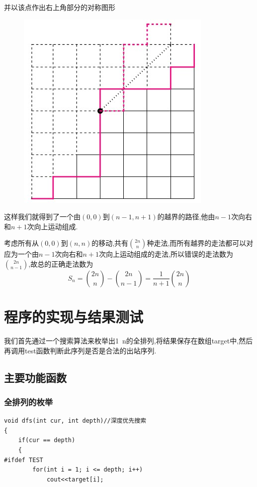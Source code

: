 \documentclass[a4paper,cs4size,oneside,fancyhdr]{ctexrep}
\theoremstyle{nonumberplain}%
\theoremstyle{nonumberplain}%
\begin{document}
{{\flushleft
并以该点作出右上角部分的对称图形

\begin{figure}[htbp]%
\centering
\includegraphics[scale=1]{3.jpg}
\end{figure}

这样我们就得到了一个由$(0,0)$到$(n-1,n+1)$的越界的路径,他由$n-1$次向右和$n+1$次向上运动组成.

考虑所有从$(0,0)$到$(n,n)$的移动,共有$\displaystyle\binom{2n}{n}$种走法,而所有越界的走法都可以对应为一个由$n-1$次向右和$n+1$次向上运动组成的走法,所以错误的走法数为$\displaystyle\binom{2n}{n-1}$,故总的正确走法数为
\[S_n=\binom{2n}{n}-\binom{2n}{n-1}=\frac{1}{n+1}\binom{2n}{n}\]



\chapter{程序的实现与结果测试}
我们首先通过一个搜索算法来枚举出1~n的全排列,将结果保存在数组target中,然后再调用test函数判断此序列是否是合法的出站序列.

\section{主要功能函数}
\subsection{全排列的枚举}
\begin{verbatim}
void dfs(int cur, int depth)//深度优先搜索
{
    if(cur == depth)
    {
#ifdef TEST
        for(int i = 1; i <= depth; i++)
            cout<<target[i];


\end{verbatim}}}
\end{document}
